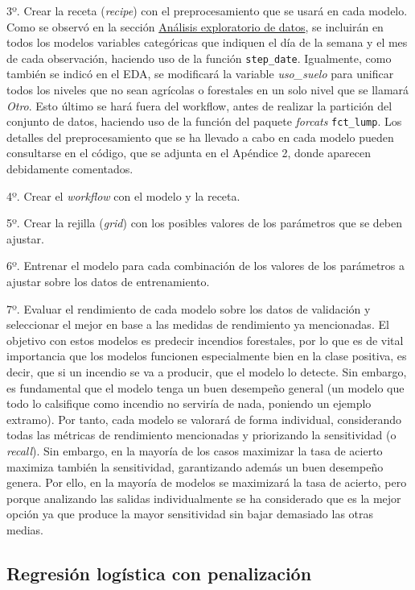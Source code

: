 \documentclass[12pt,a4paper,]{book}
\numberwithin{dummy}{section}
\theoremstyle{ocrenumbox}
\theoremstyle{blacknumex}
\theoremstyle{blacknumbox}
\theoremstyle{ocrenum}
\theoremstyle{ocrenum}
\begin{document}
3º. Crear la receta (\emph{recipe}) con el preprocesamiento que se usará
en cada modelo. Como se observó en la sección
\protect\hyperlink{anuxe1lisis-exploratorio-de-datos}{Análisis
exploratorio de datos}, se incluirán en todos los modelos variables
categóricas que indiquen el día de la semana y el mes de cada
observación, haciendo uso de la función \texttt{step\_date}. Igualmente,
como también se indicó en el EDA, se modificará la variable
\emph{uso\_suelo} para unificar todos los niveles que no sean agrícolas
o forestales en un solo nivel que se llamará \emph{Otro}. Esto último se
hará fuera del workflow, antes de realizar la partición del conjunto de
datos, haciendo uso de la función del paquete \emph{forcats}
\texttt{fct\_lump}. Los detalles del preprocesamiento que se ha llevado
a cabo en cada modelo pueden consultarse en el código, que se adjunta en
el Apéndice 2, donde aparecen debidamente comentados.

4º. Crear el \emph{workflow} con el modelo y la receta.

5º. Crear la rejilla (\emph{grid}) con los posibles valores de los
parámetros que se deben ajustar.

6º. Entrenar el modelo para cada combinación de los valores de los
parámetros a ajustar sobre los datos de entrenamiento.

7º. Evaluar el rendimiento de cada modelo sobre los datos de validación
y seleccionar el mejor en base a las medidas de rendimiento ya
mencionadas. El objetivo con estos modelos es predecir incendios
forestales, por lo que es de vital importancia que los modelos funcionen
especialmente bien en la clase positiva, es decir, que si un incendio se
va a producir, que el modelo lo detecte. Sin embargo, es fundamental que
el modelo tenga un buen desempeño general (un modelo que todo lo
calsifique como incendio no serviría de nada, poniendo un ejemplo
extramo). Por tanto, cada modelo se valorará de forma individual,
considerando todas las métricas de rendimiento mencionadas y priorizando
la sensitividad (o \emph{recall}). Sin embargo, en la mayoría de los
casos maximizar la tasa de acierto maximiza también la sensitividad,
garantizando además un buen desempeño genera. Por ello, en la mayoría de
modelos se maximizará la tasa de acierto, pero porque analizando las
salidas individualmente se ha considerado que es la mejor opción ya que
produce la mayor sensitividad sin bajar demasiado las otras medias.

\hypertarget{regresiuxf3n-loguxedstica-con-penalizaciuxf3n}{%
\subsection{Regresión logística con
penalización}\label{regresiuxf3n-loguxedstica-con-penalizaciuxf3n}}
\end{document}
